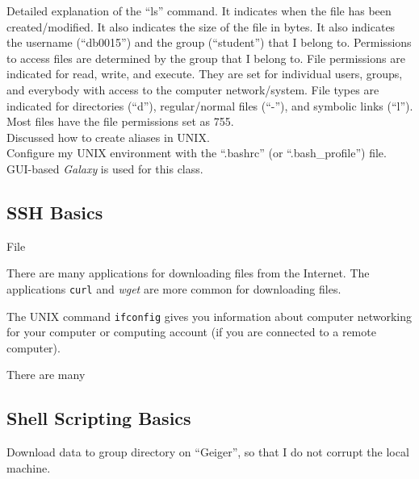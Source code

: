 Detailed explanation of the ``ls'' command. It indicates when the file has been created/modified. It also indicates the size of the file in bytes. It also indicates the username (``db0015'') and the group (``student'') that I belong to. Permissions to access files are determined by the group that I belong to. File permissions are indicated for read, write, and execute. They are set for individual users, groups, and everybody with access to the computer network/system. File types are indicated for directories (``d''), regular/normal files (``-''), and symbolic links (``l''). \\

Most files have the file permissions set as 755. \\

Discussed how to create aliases in UNIX. \\

Configure my UNIX environment with the ``.bashrc'' (or ``.bash\_profile'') file. \\

GUI-based {\it Galaxy} is used for this class. \\








\subsection{SSH Basics}
\label{ssec:SSHBasics}

File 






There are many applications for downloading files from the Internet. The applications {\tt curl} and {\it wget} are more common for downloading files.

The UNIX command {\tt ifconfig} gives you information about computer networking for your computer or computing account (if you are connected to a remote computer).


There are many 



\subsection{Shell Scripting Basics}
\label{ssec:ShellScriptingBasics}

Download data to group directory on ``Geiger'', so that I do not corrupt the local machine.


